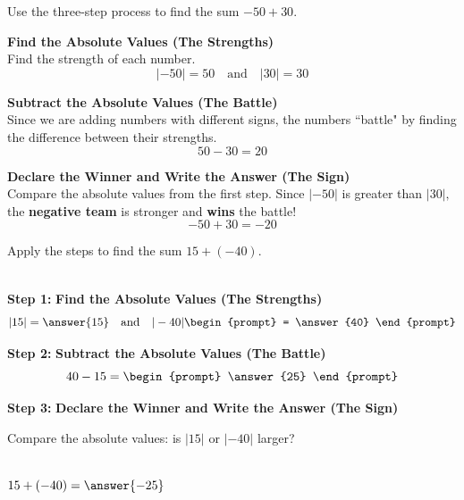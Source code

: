\documentclass{ximera}[font=12pt]
\begin{document}
\begin{example} 
    
    Use the three-step process to find the sum $-50 + 30.$

    \begin{explanation}
    \begin{description}[style=multiline, leftmargin=5em, font=\bfseries]
        \item[Step 1:] \textbf{Find the Absolute Values (The Strengths)} \\
        Find the strength of each number.
        \[ |-50| = 50 \quad \text{and} \quad |30| = 30 \]

        \item[Step 2:] \textbf{Subtract the Absolute Values (The Battle)} \\
        Since we are adding numbers with different signs, the numbers ``battle" by finding the difference between their strengths.
        \[ 50 - 30 = 20 \]

        \item[Step 3:] \textbf{Declare the Winner and Write the Answer (The Sign)} \\
        Compare the absolute values from the first step. Since $|-50|$ is greater than $|30|,$ the \textbf{negative team}
        is stronger and \textbf{wins} the battle!  
        \[ -50 + 30 = -20 \]
\end{description}
\end{explanation}
\end{example}


\bigskip

\begin{problem}
    Apply the steps to find the sum $15 + (-40).$

    ~ \\[1em]

    \textbf{Step 1:} \textbf{Find the Absolute Values (The Strengths)}
    \[ |15| = \answer{15} \quad \text{and} \quad |-40| \begin{prompt}  = \answer{40} \end{prompt} \]

    
    \textbf{Step 2:} \textbf{Subtract the Absolute Values (The Battle)}
    \[ 40 - 15 = \begin{prompt} \answer{25} \end{prompt} \]


    \textbf{Step 3:} \textbf{Declare the Winner and Write the Answer (The Sign)}

    Compare the absolute values: is $|15|$ or $|-40|$ larger?
    
    \begin{multipleChoice}
    \end{multipleChoice}

    ~ \\[2em]

     $15 + (-40) = \answer{-25}$

\end{problem}
\end{document}
